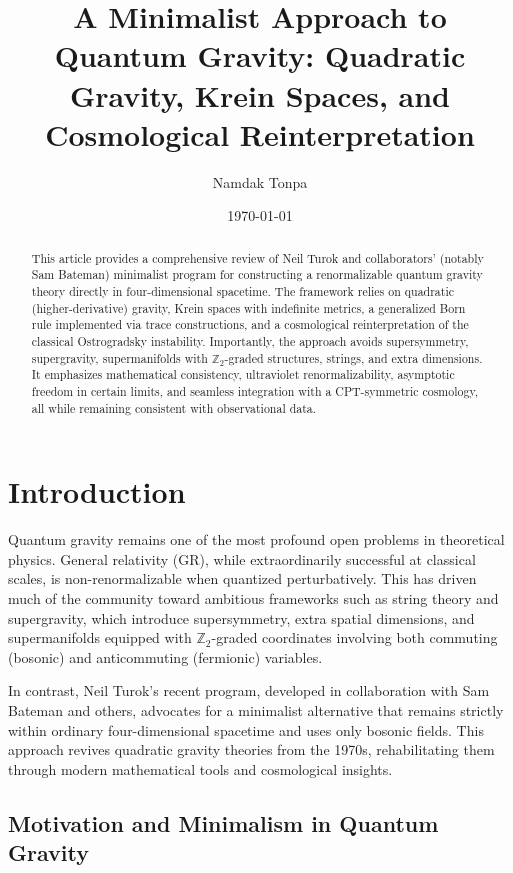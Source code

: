 \documentclass{article}
\title{A Minimalist Approach to Quantum Gravity: Quadratic Gravity, Krein Spaces, and Cosmological Reinterpretation}
\author{Namdak Tonpa}
\date{\today}
\begin{document}
\maketitle

\begin{abstract}
This article provides a comprehensive review of Neil Turok and collaborators' (notably Sam Bateman) minimalist program for constructing a renormalizable quantum gravity theory directly in four-dimensional spacetime. The framework relies on quadratic (higher-derivative) gravity, Krein spaces with indefinite metrics, a generalized Born rule implemented via trace constructions, and a cosmological reinterpretation of the classical Ostrogradsky instability. Importantly, the approach avoids supersymmetry, supergravity, supermanifolds with $\mathbb{Z}_2$-graded structures, strings, and extra dimensions. It emphasizes mathematical consistency, ultraviolet renormalizability, asymptotic freedom in certain limits, and seamless integration with a CPT-symmetric cosmology, all while remaining consistent with observational data.
\end{abstract}

\tableofcontents

\section{Introduction}
\label{sec:intro}

Quantum gravity remains one of the most profound open problems in theoretical physics. General relativity (GR), while extraordinarily successful at classical scales, is non-renormalizable when quantized perturbatively. This has driven much of the community toward ambitious frameworks such as string theory and supergravity, which introduce supersymmetry, extra spatial dimensions, and supermanifolds equipped with $\mathbb{Z}_2$-graded coordinates involving both commuting (bosonic) and anticommuting (fermionic) variables.

In contrast, Neil Turok's recent program, developed in collaboration with Sam Bateman and others, advocates for a minimalist alternative that remains strictly within ordinary four-dimensional spacetime and uses only bosonic fields. This approach revives quadratic gravity theories from the 1970s, rehabilitating them through modern mathematical tools and cosmological insights.

\subsection{Motivation and Minimalism in Quantum Gravity}
\end{document}
